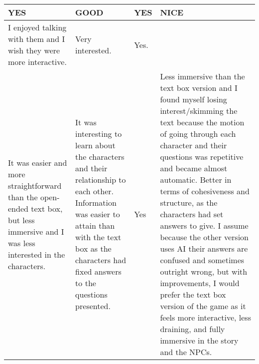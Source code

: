 \begin{table}[!ht]
\begin{tabular}{|m{7.5em}|m{7.5em}|m{7.5em}|m{7.5em}|}
        YES & GOOD & YES & NICE \\ \hline
        I enjoyed talking with them and I wish they were more interactive. & Very interested. & Yes. & ~ \\ \hline
        It was easier and more straightforward than the open-ended text box, but less immersive and I was less interested in the characters. & It was interesting to learn about the characters and their relationship to each other. Information was easier to attain than with the text box as the characters had fixed answers to the questions presented. & Yes & Less immersive than the text box version and I found myself losing interest/skimming the text because the motion of going through each character and their questions was repetitive and became almost automatic. Better in terms of cohesiveness and structure, as the characters had set answers to give. I assume because the other version uses AI their answers are confused and sometimes outright wrong, but with improvements, I would prefer the text box version of the game as it feels more interactive, less draining, and fully immersive in the story and the NPCs. \\ \hline

\end{tabular}
\end{table}
